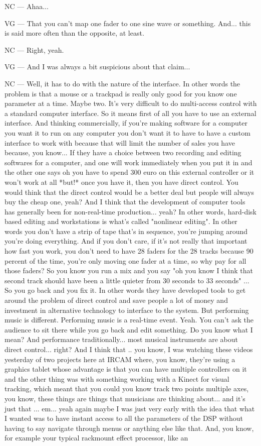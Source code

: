NC — Ahaa... 

VG — That you can't map one fader to one sine wave or something. And... this is said more often than the opposite, at least. 

NC — Right, yeah. 

VG — And I was always a bit suspicious about that claim... 

NC — Well, it has to do with the nature of the interface. In other words the problem is that a mouse or a trackpad is really only good for you know one parameter at a time. Maybe two. It's very difficult to do multi-access control with a standard computer interface. So it means first of all you have to use an external interface. And thinking commercially, if you're making software for a computer you want it to run on any computer you don't want it to have to have a custom interface to work with because that will limit the number of sales you have because, you know... If they have a choice between two recording and editing softwares for a computer, and one will work immediately when you put it in and the other one says oh you have to spend 300 euro on this external controller or it won't work at all *but!* once you have it, then you have direct control. You would think that the direct control would be a better deal but people will always buy the cheap one, yeah? And I think that the development of computer tools has generally been for non-real-time  production... yeah? In other words, hard-disk based editing and workstations is what's called "nonlinear editing". In other words you don't have a strip of tape that's in sequence, you're jumping around you're doing everything. And if you don't care, if it's not really that important how fast you work, you don't need to have 28 faders for the 28 tracks because 90 percent of the time, you're only moving one fader at a time, so why pay for all those faders? So you know you run a mix and you say "oh you know I think that second track should have been a little quieter from 30 seconds to 33 seconds" ... So you go back and you fix it. In other words they have developed tools to get around the problem of direct control and save people a lot of money and investment in alternative technology to interface to the system. But performing music is different. Performing music is a real-time event. Yeah. You can't ask the audience to sit there while you go back and edit something. Do you know what I mean? And performance traditionally... most musical instruments are about direct control... right? And I think that .. you know, I was watching these videos yesterday of two projects here at IRCAM where, you know, they're using a graphics tablet whose advantage is that you can have multiple controllers on it and the other thing was with something working with a Kinect for visual tracking, which meant that you could you know track two points multiple axes, you know, these things are things that musicians are thinking about... and it's just that ... em... yeah again maybe I was just very early with the idea that what I wanted was to have instant access to all the parameters of the DSP without having to say navigate through menus or anything else like that. And, you know, for example your typical rackmount effect processor, like an 